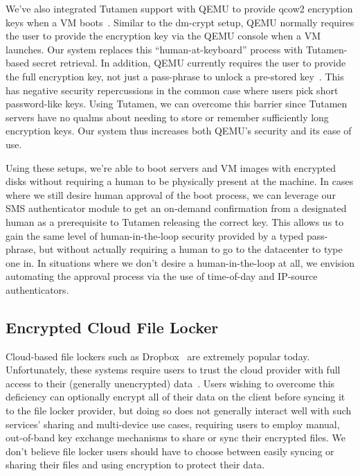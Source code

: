 We've also integrated Tutamen support with QEMU to provide qcow2
encryption keys when a VM boots~\cite{src-qemu-tutamen}. Similar to
the dm-crypt setup, QEMU normally requires the user to provide the
encryption key via the QEMU console when a VM launches. Our system
replaces this ``human-at-keyboard'' process with Tutamen-based secret
retrieval. In addition, QEMU currently requires the user to provide
the full encryption key, not just a pass-phrase to unlock a pre-stored
key~\cite{berrange-qemucrypto}. This has negative security
repercussions in the common case where users pick short password-like
keys. Using Tutamen, we can overcome this barrier since Tutamen
servers have no qualms about needing to store or remember sufficiently
long encryption keys. Our system thus increases both QEMU's security
and its ease of use.

Using these setups, we're able to boot servers and VM images with
encrypted disks without requiring a human to be physically present at
the machine. In cases where we still desire human approval of the boot
process, we can leverage our SMS authenticator module to get an
on-demand confirmation from a designated human as a prerequisite to
Tutamen releasing the correct key. This allows us to gain the same
level of human-in-the-loop security provided by a typed pass-phrase,
but without actually requiring a human to go to the datacenter to type
one in. In situations where we don't desire a human-in-the-loop at
all, we envision automating the approval process via the use of
time-of-day and IP-source authenticators.

\subsection{Encrypted Cloud File Locker}

Cloud-based file lockers such as Dropbox~\cite{dropbox} are extremely
popular today. Unfortunately, these systems require users to trust the
cloud provider with full access to their (generally unencrypted)
data~\cite{vintsurf-dropbox}. Users wishing to overcome this
deficiency can optionally encrypt all of their data on the client
before syncing it to the file locker provider, but doing so does not
generally interact well with such services' sharing and multi-device
use cases, requiring users to employ manual, out-of-band key
exchange mechanisms to share or sync their encrypted files. We don't
believe file locker users should have to choose between easily syncing
or sharing their files and using encryption to protect their data.

